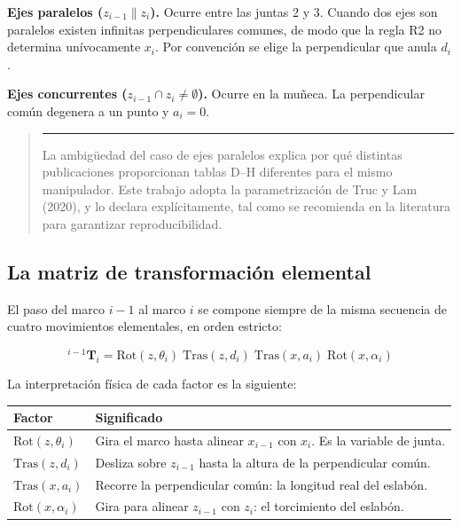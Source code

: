 \documentclass[11pt,a4paper]{article}
\newcommand{\T}[2]{{}^{#1}\mathbf{T}_{#2}}
\newenvironment{nota}
  {\begin{quote}\small\color{oscuro}\rule{2pt}{\baselineskip}\hspace{6pt}\ignorespaces}
  {\end{quote}}
\begin{document}
\textbf{Ejes paralelos ($z_{i-1} \parallel z_i$).} Ocurre entre las
juntas 2 y 3. Cuando dos ejes son paralelos existen infinitas
perpendiculares comunes, de modo que la regla R2 no determina
unívocamente $x_i$. Por convención se elige la perpendicular que anula
$d_i$.

\textbf{Ejes concurrentes ($z_{i-1} \cap z_i \neq \emptyset$).} Ocurre
en la muñeca. La perpendicular común degenera a un punto y $a_i = 0$.

\begin{nota}
La ambigüedad del caso de ejes paralelos explica por qué distintas
publicaciones proporcionan tablas D--H diferentes para el mismo
manipulador. Este trabajo adopta la parametrización de Truc y Lam
(2020), y lo declara explícitamente, tal como se recomienda en la
literatura para garantizar reproducibilidad.
\end{nota}

\subsection{La matriz de transformación elemental}
\label{sec:elemental}

El paso del marco $i-1$ al marco $i$ se compone siempre de la misma
secuencia de cuatro movimientos elementales, en orden estricto:

\begin{equation}
\boxed{\;
\T{i-1}{i} =
\mathrm{Rot}(z,\theta_i)\;
\mathrm{Tras}(z,d_i)\;
\mathrm{Tras}(x,a_i)\;
\mathrm{Rot}(x,\alpha_i)
\;}
\label{eq:elemental}
\end{equation}

La interpretación física de cada factor es la siguiente:

\begin{center}
\small
\begin{tabular}{@{}ll@{}}
\toprule
\textbf{Factor} & \textbf{Significado} \\
\midrule
$\mathrm{Rot}(z,\theta_i)$ & Gira el marco hasta alinear $x_{i-1}$ con $x_i$. Es la variable de junta. \\
$\mathrm{Tras}(z,d_i)$ & Desliza sobre $z_{i-1}$ hasta la altura de la perpendicular común. \\
$\mathrm{Tras}(x,a_i)$ & Recorre la perpendicular común: la longitud real del eslabón. \\
$\mathrm{Rot}(x,\alpha_i)$ & Gira para alinear $z_{i-1}$ con $z_i$: el torcimiento del eslabón. \\
\bottomrule
\end{tabular}
\end{center}
\end{document}
